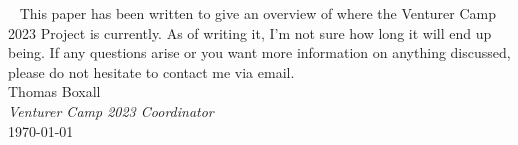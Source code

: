 \documentclass[a4paper, 11pt]{report}
\begin{document}
    \ 
    \vfill
    This paper has been written to give an overview of where the Venturer Camp 2023 Project is currently. As of writing it, I'm not sure how long it will end up being. If any questions arise or you want more information on anything discussed, please do not hesitate to contact me via email.\\[1em]
    Thomas Boxall\\
    \textit{Venturer Camp 2023 Coordinator}\\[1em]
    \today
    \vfill

    \tableofcontents
    
    
    
    

    \backPage
\end{document}
